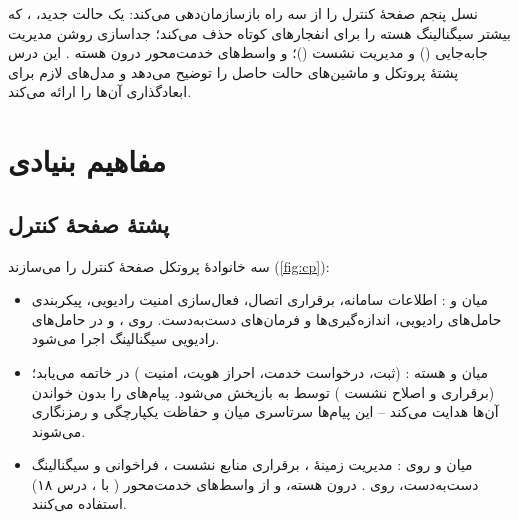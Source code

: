 \documentclass[11pt,a4paper]{article}
\begin{document}
نسل پنجم صفحهٔ کنترل را از سه راه بازسازمان‌دهی می‌کند: یک حالت  جدید، ، که بیشتر سیگنالینگ هسته را برای انفجارهای
کوتاه حذف می‌کند؛ جداسازی روشن مدیریت جابه‌جایی () و مدیریت نشست ()؛ و واسط‌های خدمت‌محور درون هسته
\cite{ts23501,ts38300}. این درس پشتهٔ پروتکل و ماشین‌های حالت حاصل را توضیح می‌دهد و مدل‌های لازم برای ابعادگذاری آن‌ها را ارائه می‌کند.

\section{مفاهیم بنیادی}

\subsection{پشتهٔ صفحهٔ کنترل}
سه خانوادهٔ پروتکل صفحهٔ کنترل را می‌سازند (\cref{fig:cp}):
\begin{itemize}
  \item \textbf{} میان  و  \cite{ts38331}: اطلاعات سامانه، برقراری اتصال، فعال‌سازی امنیت رادیویی، پیکربندی حامل‌های
        رادیویی، اندازه‌گیری‌ها و فرمان‌های دست‌به‌دست. روی ،  و  در حامل‌های رادیویی سیگنالینگ اجرا می‌شود.
  \item \textbf{} میان  و هسته \cite{ts24501}:  (ثبت، درخواست خدمت، احراز هویت، امنیت ) در  خاتمه
        می‌یابد؛  (برقراری و اصلاح نشست ) توسط  به  بازپخش می‌شود.  پیام‌های  را بدون
        خواندن آن‌ها هدایت می‌کند -- این پیام‌ها سرتاسری میان  و  حفاظت یکپارچگی و رمزنگاری می‌شوند.
  \item \textbf{} میان  و  روی  \cite{ts38413}: مدیریت زمینهٔ ، برقراری منابع نشست ، فراخوانی و
        سیگنالینگ دست‌به‌دست، روی . درون هسته،  و  از واسط‌های خدمت‌محور ( با ، درس ۱۸) استفاده
        می‌کنند.
\end{itemize}

\begin{acnfigure}
  \caption{پشتهٔ پروتکل صفحهٔ کنترل نسل پنجم:  روی ،  روی ،  سرتاسری میان  و /، و
   در هسته.}
  \label{fig:cp}
\end{acnfigure}
\end{document}
